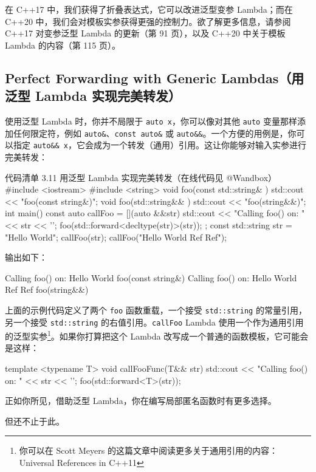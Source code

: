在 C++17 中，我们获得了折叠表达式，它可以改进泛型变参 Lambda；而在 C++20 中，我们会对模板实参获得更强的控制力。欲了解更多信息，请参阅 C++17 对变参泛型 Lambda 的更新（第 91 页），以及 C++20 中关于模板 Lambda 的内容（第 115 页）。

\subsection{Perfect Forwarding with Generic Lambdas（用泛型 Lambda 实现完美转发）}

使用泛型 Lambda 时，你并不局限于 \texttt{auto x}，你可以像对其他 \texttt{auto} 变量那样添加任何限定符，例如 \texttt{auto\&}、\texttt{const auto\&} 或 \texttt{auto\&\&}。一个方便的用例是，你可以指定 \texttt{auto\&\& x}，它会成为一个转发（通用）引用。这让你能够对输入实参进行完美转发：

\begin{codeboxt}{代码清单 3.11 用泛型 Lambda 实现完美转发（在线代码见 @Wandbox）}
#include <iostream>
#include <string>
void foo(const std::string& ) { std::cout << "foo(const string&)\n"; }
void foo(std::string&& ) { std::cout << "foo(string&&)\n"; }
int main() {
const auto callFoo = [](auto &&str) {
std::cout << "Calling foo() on: " << str << '\n';
foo(std::forward<decltype(str)>(str));
};
const std::string str = "Hello World";
callFoo(str);
callFoo("Hello World Ref Ref");
}
\end{codeboxt}

输出如下：

\begin{codebox}
Calling foo() on: Hello World
foo(const string&)
Calling foo() on: Hello World Ref Ref
foo(string&&)
\end{codebox}

上面的示例代码定义了两个 \texttt{foo} 函数重载，一个接受 \texttt{std::string} 的常量引用，另一个接受 \texttt{std::string} 的右值引用。\texttt{callFoo} Lambda 使用一个作为通用引用的泛型实参\footnote{你可以在 Scott Meyers 的这篇文章中阅读更多关于通用引用的内容：Universal References in C++11}。如果你打算把这个 Lambda 改写成一个普通的函数模板，它可能会是这样：

\begin{codebox}
template <typename T>
void callFooFunc(T&& str) {
std::cout << "Calling foo() on: " << str << '\n';
foo(std::forward<T>(str));
}
\end{codebox}

正如你所见，借助泛型 Lambda，你在编写局部匿名函数时有更多选择。

但还不止于此。

